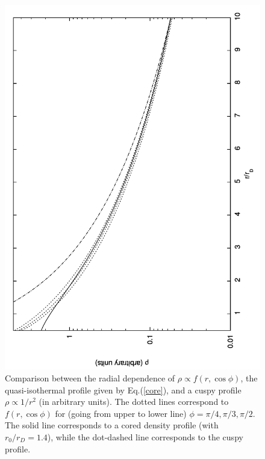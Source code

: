 \documentclass[12pt]{article}
\begin{document}
{{\begin{figure}[htpb]
    \centering
        \includegraphics[scale=0.5, angle=270]{supernovater}
    \caption{Comparison between the radial dependence of $\rho \propto f(r,\cos \phi)$, the quasi-isothermal profile given by Eq.(\ref{core}), and a cuspy profile $\rho \propto 1/r ^2$ (in arbitrary units). The dotted lines correspond to $f(r,\cos \phi)$ for (going from upper to lower line) $\phi=\pi/4,\pi/3,\pi/2$. The solid line corresponds to a cored density profile (with $r _0/r _D = 1.4$), while the dot-dashed line corresponds to the cuspy profile.}
    \label{fig:Comparison core f}
\end{figure}

}}
\end{document}
